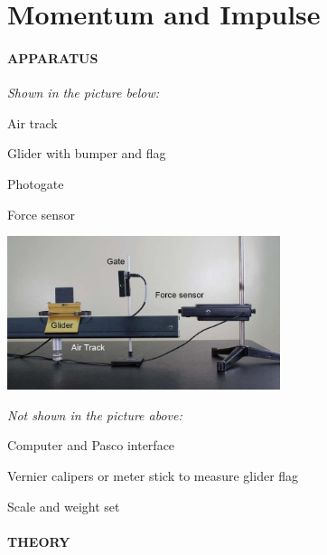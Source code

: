 
\vspace{-5ex}\part*{Momentum and Impulse}

\subsection*{APPARATUS}

\noindent\textit{Shown in the picture below:}
\squishlist
\item Air track
\item Glider with bumper and flag
\item Photogate
\item Force sensor
\squishend
\begin{center} \includegraphics*[width=0.6\textwidth]{imgs/6labs/6Alab/6Aexp5/glider_tack_main_white_text.jpg} \end{center}
\noindent\textit{Not shown in the picture above:}
\squishlist
\item Computer and Pasco interface
\item Vernier calipers or meter stick to measure glider flag
\item Scale and weight set
\squishend

\subsection*{THEORY}

